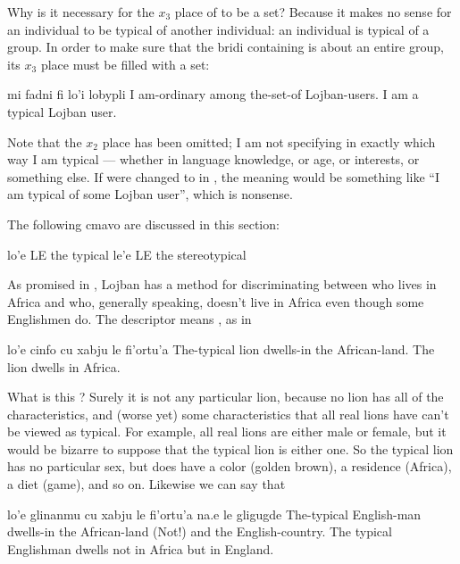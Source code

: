 Why is it necessary for the $x_3$ place of  to be a
    set? Because it makes no sense for an individual to be typical
    of another individual: an individual is typical of a group. In
    order to make sure that the bridi containing  is about
    an entire group, its $x_3$ place must be filled with a set:
\begin{example}
mi fadni fi lo'i lobypli\n
I am-ordinary among the-set-of Lojban-users.\n
I am a typical Lojban user.
\end{example}

Note that the $x_2$ place has been omitted; I am not specifying
    in exactly which way I am typical --- whether in language
    knowledge, or age, or interests, or something else. If 
    were changed to  in , the
    meaning would be something like ``I am typical of some Lojban
    user'', which is nonsense.



The following cmavo are discussed in this section:

   lo'e    LE  the typical
    le'e    LE  the stereotypical

As promised in , Lojban has a method
    for discriminating between  who lives in Africa and
     who, generally speaking, doesn't live in
    Africa even though some Englishmen do. The descriptor 
    means , as in
\begin{example}
lo'e cinfo cu xabju le fi'ortu'a\n
The-typical lion dwells-in the African-land.\n
The lion dwells in Africa.
\end{example}

What is this ? Surely it is not any particular
    lion, because no lion has all of the 
    characteristics, and (worse yet) some characteristics that all
    real lions have can't be viewed as typical. For example, all
    real lions are either male or female, but it would be bizarre
    to suppose that the typical lion is either one. So the typical
    lion has no particular sex, but does have a color (golden
    brown), a residence (Africa), a diet (game), and so on.
    Likewise we can say that
\begin{example}
lo'e glinanmu cu xabju le fi'ortu'a\n
\T	na.e le gligugde\n
The-typical English-man dwells-in the African-land\n
\T	(Not!) and the English-country.\n
The typical Englishman dwells not in Africa\n
\T	but in England.
\end{example}

